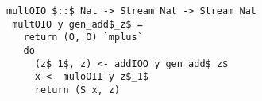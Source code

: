 \begin{figure}[!t]
  \centering
  \begin{minipage}{0.52\columnwidth}
    \begin{lstlisting}[frame=tb]
 multOIO $::$ Nat -> Stream Nat -> Stream Nat
 multOIO y gen_add$_z$ =
   return (O, O) `mplus`
   do
     (z$_1$, z) <- addIOO y gen_add$_z$
     x <- muloOII y z$_1$
     return (S x, z)
    \end{lstlisting}
  \end{minipage}
\end{figure}
